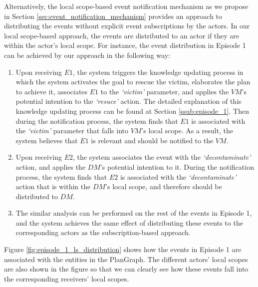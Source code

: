 Alternatively, the local scope-based event notification mechanism as we propose in Section \ref{sec:event_notification_mechanism} provides an approach to distributing the events without explicit event subscriptions by the actors. In our local scope-based approach, the events are distributed to an actor if they are within the actor's local scope. For instance, the event distribution in Episode 1 can be achieved by our approach in the following way:

\begin{enumerate}
	\item Upon receiving $E1$, the system triggers the knowledge updating process in which the system activates the goal to rescue the victim, elaborates the plan to achieve it, associates $E1$ to the \emph{`victim'} parameter, and applies the $VM$'s potential intention to the \emph{`resuce'} action. The detailed explanation of this knowledge updating process can be found at Section \ref{ssub:episode_1}. Then during the notification process, the system finds that $E1$ is associated with the \emph{`victim'} parameter that falls into $VM$'s local scope. As a result, the system believes that $E1$ is relevant and should be notified to the $VM$.
	\item Upon receiving $E2$, the system associates the event with the \emph{`decontaminate'} action, and applies the $DM$'s potential intention to it. During the notification process, the system finds that $E2$ is associated with the \emph{`decontaminate'} action that is within the $DM$'s local scope, and therefore should be distributed to $DM$.
	\item The similar analysis can be performed on the rest of the events in Episode 1, and the system achieves the same effect of distributing these events to the corresponding actors as the subscription-based approach.
\end{enumerate}

Figure \ref{fig:episode_1_ls_distribution} shows how the events in Episode 1 are associated with the entities in the PlanGraph. The different actors' local scopes are also shown in the figure so that we can clearly see how these events fall into the corresponding receivers' local scopes.

